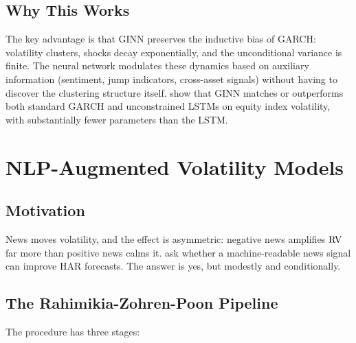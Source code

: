 \subsection{Why This Works}

The key advantage is that GINN preserves the inductive bias of GARCH:
volatility clusters, shocks decay exponentially, and the unconditional
variance is finite.  The neural network modulates these dynamics based on
auxiliary information (sentiment, jump indicators, cross-asset signals)
without having to discover the clustering structure itself.
\citet{GINN2024} show that GINN matches or outperforms both standard
GARCH and unconstrained LSTMs on equity index volatility, with
substantially fewer parameters than the LSTM.


\section{NLP-Augmented Volatility Models}\label{sec:hybrid:nlp}

\subsection{Motivation}

News moves volatility, and the effect is asymmetric: negative news
amplifies $\operatorname{RV}$ far more than positive news calms it.
\citet{RahimikiaZohrenPoon2021NLP} ask whether a machine-readable
news signal can improve HAR forecasts.  The answer is yes, but modestly
and conditionally.

\subsection{The Rahimikia-Zohren-Poon Pipeline}

The procedure has three stages:

